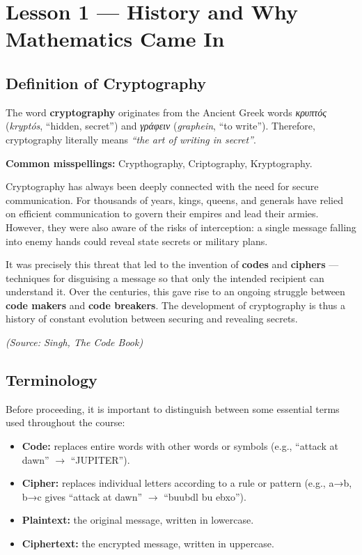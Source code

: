 \section{Lesson 1 — History and Why Mathematics Came In}

\subsection{Definition of Cryptography}

The word \textbf{cryptography} originates from the Ancient Greek words \textit{κρυπτός} (\textit{kryptós}, “hidden, secret”) and \textit{γράφειν} (\textit{graphein}, “to write”).  
Therefore, cryptography literally means \textit{“the art of writing in secret”}.

\textbf{Common misspellings:} Crypthography, Criptography, Kryptography.

Cryptography has always been deeply connected with the need for secure communication. For thousands of years, kings, queens, and generals have relied on efficient communication to govern their empires and lead their armies. However, they were also aware of the risks of interception: a single message falling into enemy hands could reveal state secrets or military plans.  

It was precisely this threat that led to the invention of \textbf{codes} and \textbf{ciphers} — techniques for disguising a message so that only the intended recipient can understand it. Over the centuries, this gave rise to an ongoing struggle between \textbf{code makers} and \textbf{code breakers}. The development of cryptography is thus a history of constant evolution between securing and revealing secrets.  
\begin{flushright}
\textit{(Source: Singh, \emph{The Code Book})}
\end{flushright}

\subsection{Terminology}

Before proceeding, it is important to distinguish between some essential terms used throughout the course:

\begin{itemize}
  \item \textbf{Code:} replaces entire words with other words or symbols (e.g., “attack at dawn” $\rightarrow$ “JUPITER”).
  \item \textbf{Cipher:} replaces individual letters according to a rule or pattern (e.g., a→b, b→c gives “attack at dawn” $\rightarrow$ “buubdl bu ebxo”).
  \item \textbf{Plaintext:} the original message, written in lowercase.
  \item \textbf{Ciphertext:} the encrypted message, written in uppercase.
\end{itemize}

